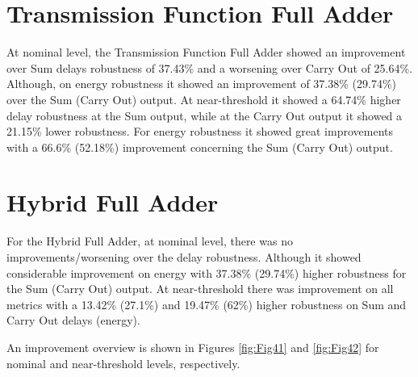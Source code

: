 \documentclass[ecp,tc, english]{iiufrgs}
\begin{document}
\section{Transmission Function Full Adder}
At nominal level, the Transmission Function Full Adder showed an improvement over Sum delays robustness of 37.43\% and a worsening over Carry Out of 25.64\%. Although, on energy robustness it showed an improvement of 37.38\% (29.74\%) over the Sum (Carry Out) output. 
At near-threshold it showed a 64.74\% higher delay robustness at the Sum output, while at the Carry Out output it showed a 21.15\% lower robustness.  For energy robustness it showed great improvements with a 66.6\% (52.18\%) improvement concerning the Sum (Carry Out) output.


\section{Hybrid Full Adder}
For the Hybrid Full Adder, at nominal level, there was no improvements/worsening over the delay robustness. Although it showed considerable improvement on energy with 37.38\% (29.74\%) higher robustness for the Sum (Carry Out) output. 
At near-threshold there was improvement on all metrics with a 13.42\% (27.1\%) and 19.47\% (62\%) higher robustness on Sum and Carry Out delays (energy).

An improvement overview is shown in Figures \ref{fig:Fig41} and \ref{fig:Fig42} for nominal and near-threshold levels, respectively.
\end{document}
